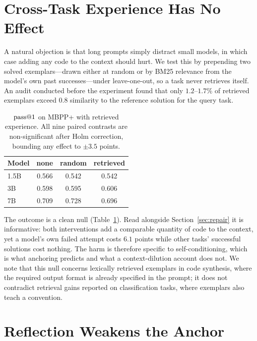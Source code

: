 \section{Cross-Task Experience Has No Effect}
\label{sec:memory}

A natural objection is that long prompts simply distract small models, in which
case adding any code to the context should hurt. We test this by prepending two
solved exemplars---drawn either at random or by BM25 relevance from the model's
own past successes---under leave-one-out, so a task never retrieves itself. An
audit conducted before the experiment found that only $1.2$--$1.7\%$ of
retrieved exemplars exceed $0.8$ similarity to the reference solution for the
query task.

\begin{table}[t]
  \centering
  \small
  \caption{$\mathrm{pass}@1$ on MBPP+ with retrieved experience. All nine paired
  contrasts are non-significant after Holm correction, bounding any effect to
  $\pm3.5$ points.}
  \label{tab:memory}
  \begin{tabular}{lccc}
    \toprule
    Model & none & random & retrieved \\
    \midrule
    1.5B & 0.566 & 0.542 & 0.542 \\
    3B   & 0.598 & 0.595 & 0.606 \\
    7B   & 0.709 & 0.728 & 0.696 \\
    \bottomrule
  \end{tabular}
\end{table}

The outcome is a clean null (Table~\ref{tab:memory}). Read alongside
Section~\ref{sec:repair} it is informative: both interventions add a comparable
quantity of code to the context, yet a model's own failed attempt costs $6.1$
points while other tasks' successful solutions cost nothing. The harm is
therefore specific to self-conditioning, which is what anchoring predicts and
what a context-dilution account does not. We note that this null concerns
lexically retrieved exemplars in code synthesis, where the required output
format is already specified in the prompt; it does not contradict retrieval
gains reported on classification tasks, where exemplars also teach a
convention.

\section{Reflection Weakens the Anchor}
\label{sec:reflect}

